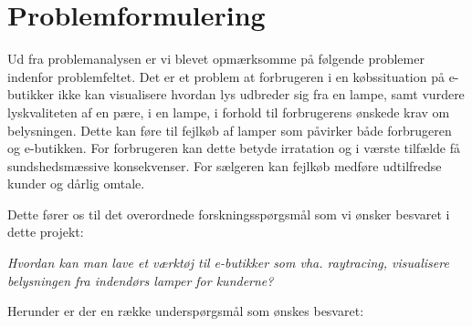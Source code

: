 \section{Problemformulering}

Ud fra problemanalysen er vi blevet opmærksomme på følgende problemer indenfor problemfeltet. 
Det er et problem at forbrugeren i en købssituation på e-butikker ikke kan visualisere hvordan lys udbreder sig fra en lampe, samt vurdere lyskvaliteten af en pære, i en lampe, i forhold til forbrugerens ønskede krav om belysningen. Dette kan føre til fejlkøb af lamper som påvirker både forbrugeren og e-butikken. For forbrugeren kan dette betyde irratation og i værste tilfælde få sundshedsmæssive konsekvenser. For sælgeren kan fejlkøb medføre udtilfredse kunder og dårlig omtale. 

Dette fører os til det overordnede forskningsspørgsmål som vi ønsker besvaret i dette projekt:

\textit{Hvordan kan man lave et værktøj til e-butikker som vha. raytracing, visualisere belysningen fra indendørs lamper for kunderne?}

Herunder er der en række underspørgsmål som ønskes besvaret:


